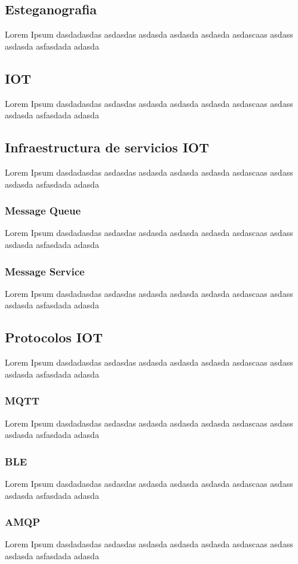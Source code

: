 \subsection{Esteganografia}
Lorem Ipsum dasdadasdas asdasdas asdasda asdasda asdasda asdascaas asdass asdasda asfasdada adasda
\subsection{IOT}
Lorem Ipsum dasdadasdas asdasdas asdasda asdasda asdasda asdascaas asdass asdasda asfasdada adasda
\subsection{Infraestructura de servicios IOT}
Lorem Ipsum dasdadasdas asdasdas asdasda asdasda asdasda asdascaas asdass asdasda asfasdada adasda
\subsubsection{Message Queue}
Lorem Ipsum dasdadasdas asdasdas asdasda asdasda asdasda asdascaas asdass asdasda asfasdada adasda
\subsubsection{Message Service}

Lorem Ipsum dasdadasdas asdasdas asdasda asdasda asdasda asdascaas asdass asdasda asfasdada adasda
\subsection{Protocolos IOT}
Lorem Ipsum dasdadasdas asdasdas asdasda asdasda asdasda asdascaas asdass asdasda asfasdada adasda
\subsubsection{MQTT}
Lorem Ipsum dasdadasdas asdasdas asdasda asdasda asdasda asdascaas asdass asdasda asfasdada adasda
\subsubsection{BLE}
Lorem Ipsum dasdadasdas asdasdas asdasda asdasda asdasda asdascaas asdass asdasda asfasdada adasda
\subsubsection{AMQP}
Lorem Ipsum dasdadasdas asdasdas asdasda asdasda asdasda asdascaas asdass asdasda asfasdada adasda
